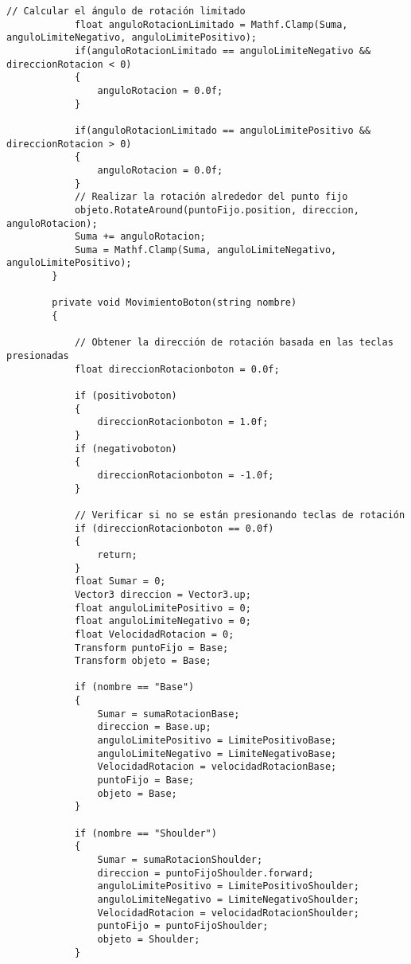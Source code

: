 \begin{lstlisting}[frame=single]
            // Calcular el ángulo de rotación limitado
            float anguloRotacionLimitado = Mathf.Clamp(Suma, anguloLimiteNegativo, anguloLimitePositivo);
            if(anguloRotacionLimitado == anguloLimiteNegativo && direccionRotacion < 0)
            {
                anguloRotacion = 0.0f;
            }
    
            if(anguloRotacionLimitado == anguloLimitePositivo && direccionRotacion > 0)
            {
                anguloRotacion = 0.0f;
            }
            // Realizar la rotación alrededor del punto fijo
            objeto.RotateAround(puntoFijo.position, direccion, anguloRotacion);
            Suma += anguloRotacion;
            Suma = Mathf.Clamp(Suma, anguloLimiteNegativo, anguloLimitePositivo);
        }
    
        private void MovimientoBoton(string nombre)
        {
            
            // Obtener la dirección de rotación basada en las teclas presionadas
            float direccionRotacionboton = 0.0f;
    
            if (positivoboton)
            {
                direccionRotacionboton = 1.0f;
            }
            if (negativoboton)
            {
                direccionRotacionboton = -1.0f;
            }
    
            // Verificar si no se están presionando teclas de rotación
            if (direccionRotacionboton == 0.0f)
            {
                return;
            }
            float Sumar = 0;
            Vector3 direccion = Vector3.up;
            float anguloLimitePositivo = 0;
            float anguloLimiteNegativo = 0;
            float VelocidadRotacion = 0;
            Transform puntoFijo = Base;
            Transform objeto = Base;
    
            if (nombre == "Base")
            {
                Sumar = sumaRotacionBase;
                direccion = Base.up;
                anguloLimitePositivo = LimitePositivoBase;
                anguloLimiteNegativo = LimiteNegativoBase;
                VelocidadRotacion = velocidadRotacionBase;
                puntoFijo = Base;
                objeto = Base;
            }
    
            if (nombre == "Shoulder")
            {
                Sumar = sumaRotacionShoulder;
                direccion = puntoFijoShoulder.forward;
                anguloLimitePositivo = LimitePositivoShoulder;
                anguloLimiteNegativo = LimiteNegativoShoulder;
                VelocidadRotacion = velocidadRotacionShoulder;
                puntoFijo = puntoFijoShoulder;
                objeto = Shoulder;
            }
    

\end{lstlisting}
